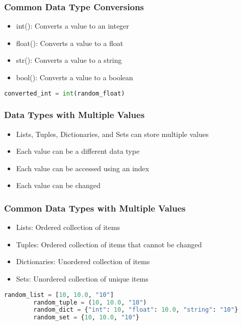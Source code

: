 \documentclass[serif, 9pt, aspectratio=32]{beamer}
\begin{document}
\begin{frame}
    \centering
    \frametitle{Common Data Type Conversions}
    \begin{itemize}
        \setlength{\itemsep}{3em}
        \item int(): Converts a value to an integer
        \item float(): Converts a value to a float
        \item str(): Converts a value to a string
        \item bool(): Converts a value to a boolean
    \end{itemize}
\end{frame}

\begin{frame}[fragile]
    \begin{lstlisting}[language=Python]
        converted_int = int(random_float)
    \end{lstlisting}
\end{frame}

\begin{frame}
    \centering
    \frametitle{Data Types with Multiple Values}
    \begin{itemize}
        \setlength{\itemsep}{3em}
        \item Lists, Tuples, Dictionaries, and Sets can store multiple values
        \item Each value can be a different data type
        \item Each value can be accessed using an index
        \item Each value can be changed
    \end{itemize}
\end{frame}

\begin{frame}
    \centering
    \frametitle{Common Data Types with Multiple Values}
    \begin{itemize}
        \setlength{\itemsep}{3em}
        \item Lists: Ordered collection of items
        \item Tuples: Ordered collection of items that cannot be changed
        \item Dictionaries: Unordered collection of items
        \item Sets: Unordered collection of unique items
    \end{itemize}
\end{frame}

\begin{frame}[fragile]
    \begin{lstlisting}[language=Python]
        random_list = [10, 10.0, "10"]
        random_tuple = (10, 10.0, "10")
        random_dict = {"int": 10, "float": 10.0, "string": "10"}
        random_set = {10, 10.0, "10"}
    \end{lstlisting}
\end{frame}
\end{document}
